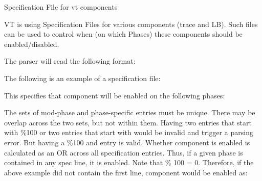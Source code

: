 Specification File for vt components

VT is using Specification Files for various components (trace and LB). Such files can be used to control when (on which Phases) these components should be enabled/disabled.

The parser will read the following format\+:


\begin{DoxyCode}{0}

\end{DoxyCode}


The following is an example of a specification file\+:


\begin{DoxyCode}{0}

\end{DoxyCode}


This specifies that component will be enabled on the following phases\+:


\begin{DoxyCode}{0}
\DoxyCodeLine{\{}
\DoxyCodeLine{\}}

\end{DoxyCode}


The sets of mod-\/phase and phase-\/specific entries must be unique. There may be overlap across the two sets, but not within them. Having two entries that start with {\ttfamily \%100} or two entries that start with {} would be invalid and trigger a parsing error. But having a {\ttfamily \%100} and {} entry is valid. Whether component is enabled is calculated as an OR across all specification entries. Thus, if a given phase is contained in any spec line, it is enabled. Note that { \% 100 = 0}. Therefore, if the above example did not contain the first line, component would be enabled as\+:


\begin{DoxyCode}{0}
\DoxyCodeLine{\{}
\DoxyCodeLine{  [97,103],}
\DoxyCodeLine{  [195,205],}
\DoxyCodeLine{\}}

\end{DoxyCode}
 